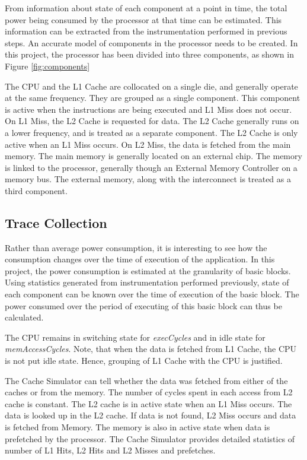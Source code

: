 From information about state of each component at a point in time, the total power being consumed by the processor at that time can be estimated. This information can be extracted from the instrumentation performed in previous steps. An accurate model of components in the processor needs to be created. In this project, the processor has been divided into three components, as shown in Figure \ref{fig:components}

The CPU and the L1 Cache are collocated on a single die, and generally operate at the same frequency. They are grouped as a single component. This component is active when the instructions are being executed and L1 Miss does not occur. On L1 Miss, the L2 Cache is requested for data. The L2 Cache generally runs on a lower frequency, and is treated as a separate component. The L2 Cache is only active when an L1 Miss occurs. On L2 Miss, the data is fetched from the main memory. The main memory is generally located on an external chip. The memory is linked to the processor, generally though an External Memory Controller on a memory bus. The external memory, along with the interconnect is treated as a third component.

\subsection{Trace Collection}
Rather than average power consumption, it is interesting to see how the consumption changes over the time of execution of the application. In this project, the power consumption is estimated at the granularity of basic blocks. Using statistics generated from instrumentation performed previously, state of each component can be known over the time of execution of the basic block. The power consumed over the period of executing of this basic block can thus be calculated.

The CPU remains in switching state for \emph{execCycles} and in idle state for \emph{memAccessCycles}. Note, that when the data is fetched from L1 Cache, the CPU is not put idle state. Hence, grouping of L1 Cache with the CPU is justified. 

The Cache Simulator can tell whether the data was fetched from either of the caches or from the memory. The number of cycles spent in each access from L2 cache is constant. The L2 cache is in active state when an L1 Miss occurs. The data is looked up in the L2 cache. If data is not found, L2 Miss occurs and data is fetched from Memory. The memory is also in active state when data is prefetched by the processor. The Cache Simulator provides detailed statistics of number of L1 Hits, L2 Hits and L2 Misses and prefetches.

